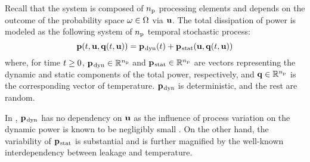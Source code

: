 Recall that the system is composed of ${n_\text{p}}$ processing elements and depends on the outcome of the probability space $\omega \in \Omega$ via $\mathbf{u}$.
The total dissipation of power is modeled as the following system of ${n_\text{p}}$ temporal stochastic process:
\begin{equation} \elab{power-model}
  \vp(\t, \vu, \vq(\t, \vu)) = \vp_\dynamic(\t) + \vp_\static(\vu, \vq(\t, \vu))
\end{equation}
where, for time $t \geq 0$, $\mathbf{p}_{\text{\kern0.1emdyn}} \in \mathbb{R}^{n_\text{p}}$ and $\mathbf{p}_{\text{\kern0.1emstat}} \in \mathbb{R}^{n_\text{p}}$ are vectors representing the dynamic and static components of the total power, respectively, and $\mathbf{q} \in \mathbb{R}^{n_\text{p}}$ is the corresponding vector of temperature.
$\mathbf{p}_{\text{\kern0.1emdyn}}$ is deterministic, and the rest are random.
\begin{remark}
In , \textnormal{$\mathbf{p}_{\text{\kern0.1emdyn}}$} has no dependency on $\mathbf{u}$ as the influence of process variation on the dynamic power is known to be negligibly small \cite{srivastava2010}.
On the other hand, the variability of \textnormal{$\mathbf{p}_{\text{\kern0.1emstat}}$} is substantial and is further magnified by the well-known interdependency between leakage and temperature.
\end{remark}
